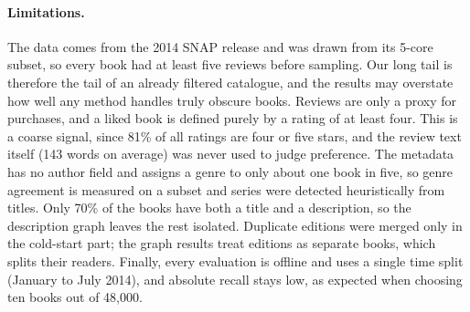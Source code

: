 \paragraph{Limitations.}
The data comes from the 2014 SNAP release and was drawn from its 5-core subset,
so every book had at least five reviews before sampling. Our long tail is
therefore the tail of an already filtered catalogue, and the results may
overstate how well any method handles truly obscure books. Reviews are only a
proxy for purchases, and a liked book is defined purely by a rating of at least
four. This is a coarse signal, since 81\% of all ratings are four or five stars,
and the review text itself (143 words on average) was never used to judge
preference.
The metadata has no author field and assigns a genre to only about one book in
five, so genre agreement is measured on a subset and series were detected
heuristically from titles. Only 70\% of the books have both a title and a
description, so the description graph leaves the rest isolated. Duplicate editions were merged only in the cold-start
part; the graph results treat editions as separate books, which splits their
readers. Finally, every evaluation is offline and uses a single time split
(January to July 2014), and absolute recall stays low, as expected when choosing
ten books out of 48,000.

